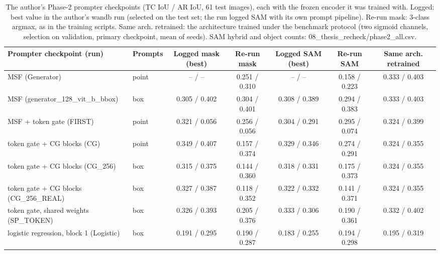 \begin{table}[htbp]
\centering
\small
\begin{adjustbox}{max width=\linewidth}
\begin{tabular}{llccccc}
\toprule
Prompter checkpoint (run) & Prompts & Logged mask (best) & Re-run mask & Logged SAM (best) & Re-run SAM & Same arch. retrained \\
\midrule
MSF (Generator) & point & -- / -- & 0.251 / 0.310 & -- / -- & 0.158 / 0.223 & 0.333 / 0.403 \\
MSF (generator\_128\_vit\_b\_bbox) & box & 0.305 / 0.402 & 0.304 / 0.401 & 0.308 / 0.389 & 0.294 / 0.383 & 0.333 / 0.403 \\
MSF + token gate (FIRST) & point & 0.321 / 0.056 & 0.256 / 0.056 & 0.304 / 0.291 & 0.295 / 0.074 & 0.324 / 0.399 \\
token gate + CG blocks (CG) & point & 0.349 / 0.407 & 0.157 / 0.374 & 0.329 / 0.346 & 0.274 / 0.291 & 0.324 / 0.355 \\
token gate + CG blocks (CG\_256) & box & 0.315 / 0.375 & 0.144 / 0.360 & 0.318 / 0.331 & 0.175 / 0.373 & 0.324 / 0.355 \\
token gate + CG blocks (CG\_256\_REAL) & box & 0.327 / 0.387 & 0.118 / 0.352 & 0.322 / 0.332 & 0.141 / 0.371 & 0.324 / 0.355 \\
token gate, shared weights (SP\_TOKEN) & box & 0.326 / 0.393 & 0.205 / 0.376 & 0.333 / 0.306 & 0.190 / 0.361 & 0.332 / 0.402 \\
logistic regression, block 1 (Logistic) & box & 0.191 / 0.295 & 0.190 / 0.287 & 0.183 / 0.255 & 0.194 / 0.298 & 0.195 / 0.319 \\
\bottomrule
\end{tabular}
\end{adjustbox}
\caption{The author's Phase-2 prompter checkpoints (TC IoU / AR IoU, 61 test images), each with the frozen encoder it was trained with. Logged: best value in the author's wandb run (selected on the test set; the run logged SAM with its own prompt pipeline). Re-run mask: 3-class argmax, as in the training scripts. Same arch. retrained: the architecture trained under the benchmark protocol (two sigmoid channels, selection on validation, primary checkpoint, mean of seeds). SAM hybrid and object counts: 08\_thesis\_recheck/phase2\_all.csv.}
\label{tab:thesis_recheck_phase2}
\end{table}
